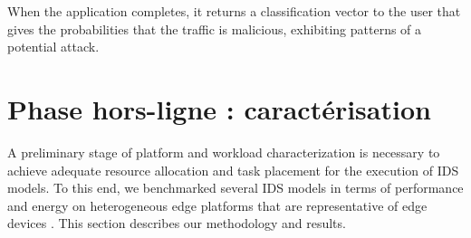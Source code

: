 When the application completes, it returns a classification vector to the user that gives the probabilities that the traffic is malicious, exhibiting patterns of a potential attack.

\section{Phase hors-ligne : caractérisation} 
\label{section:herocache-workload}



A preliminary stage of platform and workload characterization is necessary to achieve adequate resource allocation and task placement for the execution of IDS models. To this end, we benchmarked several IDS models in terms of performance and energy on heterogeneous edge platforms that are representative of edge devices \cite{kljucaric2020}. %
This section describes our methodology and results.


